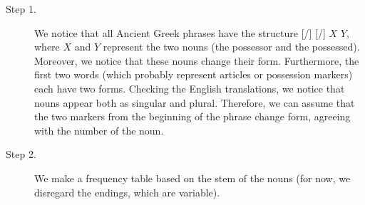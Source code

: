 \begin{refsection}
\begin{mysolution}

\begin{description}
  \item[{Step 1.}] We notice that all Ancient Greek phrases have the structure [/] [/] $X$ $Y$, where $X$ and $Y$ represent the two nouns (the possessor and the possessed). Moreover, we notice that these nouns change their form. Furthermore, the first two words (which probably represent articles or possession markers) each have two forms. Checking the English translations, we notice that nouns appear both as singular and plural. Therefore, we can assume that the two markers from the beginning of the phrase change form, agreeing with the number of the noun.

\item[{Step 2.}] We make a frequency table based on the stem of the nouns (for now, we disregard the endings, which are variable).


\end{description}
\end{mysolution}
\end{refsection}
